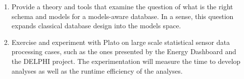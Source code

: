 \begin{enumerate}
%  
\item Provide a theory and tools that examine the question of what is the right schema and models for a models-aware database. In a sense, this question expands classical database design into the models space.
%
\item Exercise and experiment with Plato on large scale statistical sensor data processing cases, such as the ones presented by the Energy Dashboard and the DELPHI project. The experimentation will measure the time to develop analyses as well as the runtime efficiency of the analyses.
%
\end{enumerate}

